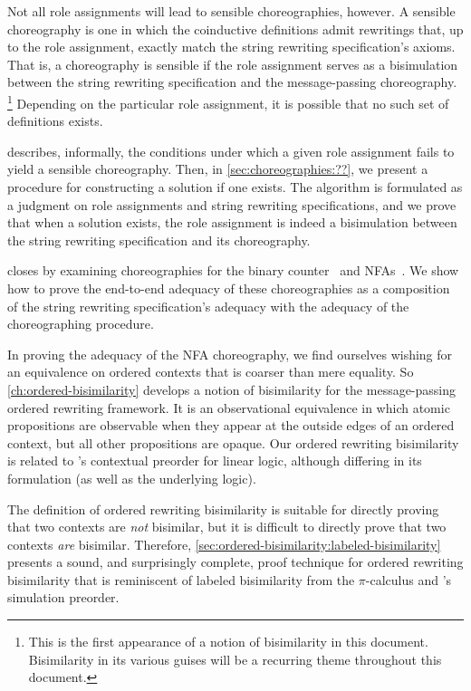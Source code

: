 Not all role assignments will lead to sensible choreographies, however.
A sensible choreography is one in which the coinductive definitions admit rewritings that, up to the role assignment, exactly match the string rewriting specification's axioms.
That is, a choreography is sensible if the role assignment serves as a bisimulation between the string rewriting specification and the message-passing choreography.%
\footnote{This is the first appearance of a notion of bisimilarity in this document.
Bisimilarity in its various guises will be a recurring theme throughout this document.}
Depending on the particular role assignment, it is possible that no such set of definitions exists.

 describes, informally, the conditions under which a given role assignment fails to yield a sensible choreography.
Then, in \cref{sec:choreographies:??}, we present a procedure for constructing a solution if one exists.
The algorithm is formulated as a judgment on role assignments and string rewriting specifications, and we prove that when a solution exists, the role assignment is indeed a bisimulation between the string rewriting specification and its choreography.

 closes by examining choreographies for the binary counter~ and \acsp*{NFA}~.
We show how to prove the end-to-end adequacy of these choreographies as a composition of the string rewriting specification's adequacy with the adequacy of the choreographing procedure.

In proving the adequacy of the \acs*{NFA} choreography, we find ourselves wishing for an equivalence on ordered contexts that is coarser than mere equality.
So \cref{ch:ordered-bisimilarity} develops a notion of bisimilarity for the message-passing ordered rewriting framework.
It is an observational equivalence in which atomic propositions are observable when they appear at the outside edges of an ordered context, but all other propositions are opaque.
Our ordered rewriting bisimilarity is related to \citeauthor{Deng+:MSCS16}'s contextual preorder for linear logic\autocite{Deng+:MSCS16}, although differing in its formulation (as well as the underlying logic).

The definition of ordered rewriting bisimilarity is suitable for directly proving that two contexts are \emph{not} bisimilar, but it is difficult to directly prove that two contexts \emph{are} bisimilar.
Therefore, \cref{sec:ordered-bisimilarity:labeled-bisimilarity} presents a sound, and surprisingly complete, proof technique for ordered rewriting bisimilarity that is reminiscent of labeled bisimilarity from the $\pi$-calculus\autocite{Sangiorgi+Walker:CUP03} and \citeauthor{Deng+:MSCS16}'s simulation preorder\autocite{Deng+:MSCS16}.

